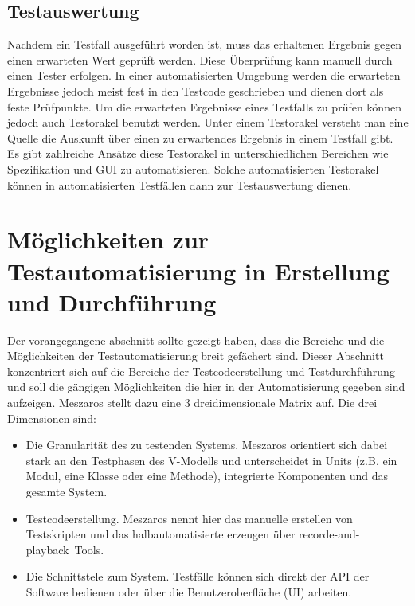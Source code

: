 \subsection{Testauswertung}
\label{subsec:testauswertung}
Nachdem ein Testfall ausgeführt worden ist, muss das erhaltenen Ergebnis gegen einen erwarteten Wert geprüft werden.
Diese Überprüfung kann manuell durch einen Tester erfolgen. 
In einer automatisierten Umgebung werden die erwarteten Ergebnisse jedoch meist fest in den Testcode geschrieben und dienen dort als feste Prüfpunkte.
Um die erwarteten Ergebnisse eines Testfalls zu prüfen können jedoch auch Testorakel benutzt werden. Unter einem Testorakel versteht man eine Quelle die Auskunft über einen zu erwartendes Ergebnis in einem Testfall gibt. Es gibt zahlreiche Ansätze diese Testorakel in unterschiedlichen Bereichen wie Spezifikation und GUI zu automatisieren. \cite{memon_automated_2000} \cite{richardson_specification-based_1992}
\cite{shahamiri_comparative_2009} Solche automatisierten Testorakel können in automatisierten Testfällen dann zur Testauswertung dienen.


\section{Möglichkeiten zur Testautomatisierung in Erstellung und Durchführung}
\label{sec:möglichkeiten_zur_testautomatisierung_in_erstellung_und_durchführung}
Der vorangegangene abschnitt sollte gezeigt haben, dass die Bereiche und die Möglichkeiten der Testautomatisierung breit gefächert sind. Dieser Abschnitt konzentriert sich auf die Bereiche der Testcodeerstellung und Testdurchführung und soll die gängigen Möglichkeiten die hier in der Automatisierung gegeben sind aufzeigen. Meszaros \cite{meszaros_agile_2003} stellt dazu eine 3 dreidimensionale Matrix auf.
Die drei Dimensionen sind:

\begin{itemize}
	  \itemsep0pt
      \item Die Granularität des zu testenden Systems. Meszaros orientiert sich dabei stark an den Testphasen des V-Modells und unterscheidet in Units (z.B. ein Modul, eine Klasse oder eine Methode), integrierte Komponenten und das gesamte System.
      \item Testcodeerstellung. Meszaros nennt hier das manuelle erstellen von Testskripten und das halbautomatisierte erzeugen über \glqq recorde-and-playback\grqq\ Tools. 
      \item Die Schnittstele zum System. Testfälle können sich direkt der API der Software bedienen oder über die Benutzeroberfläche (UI) arbeiten.
\end{itemize}

